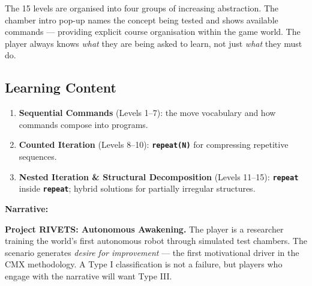 \documentclass[12pt,a4paper]{article}
\newcommand{\keyword}[1]{\textcolor{keyword}{\texttt{\bfseries #1}}}
\newcommand{\gddfield}[2]{%
  \noindent\begin{minipage}[t]{3.5cm}\bfseries\color{accent}\sffamily#1\end{minipage}%
  \hspace{8pt}%
  \begin{minipage}[t]{\dimexpr\linewidth-3.5cm-8pt\relax}%
    #2
  \end{minipage}\par\smallskip}
\begin{document}
\vspace{4pt}

\begin{tcolorbox}[gddbox, title={Course Organisation}]
The 15 levels are organised into four groups of increasing abstraction. The chamber intro pop-up names the concept being tested and shows available commands --- providing explicit course organisation within the game world. The player always knows \emph{what} they are being asked to learn, not just \emph{what} they must do.
\end{tcolorbox}

\vspace{6pt}

\subsection{Learning Content}

\begin{tcolorbox}[gddbox, title={Units of Learning}]
\begin{enumerate}[label=\textbf{Unit \arabic*.}, leftmargin=3.5em, noitemsep]
  \item \textbf{Sequential Commands} (Levels 1--7): the move vocabulary and how commands compose into programs.
  \item \textbf{Counted Iteration} (Levels 8--10): \keyword{repeat(N)} for compressing repetitive sequences.
  \item \textbf{Nested Iteration \& Structural Decomposition} (Levels 11--15): \keyword{repeat} inside \keyword{repeat}; hybrid solutions for partially irregular structures.
\end{enumerate}
\end{tcolorbox}

\vspace{4pt}

\begin{tcolorbox}[gddbox, title={Scenario}]
\gddfield{Narrative:}{\textbf{Project RIVETS: Autonomous Awakening.} The player is a researcher training the world's first autonomous robot through simulated test chambers. The scenario generates \emph{desire for improvement} --- the first motivational driver in the CMX methodology. A Type I classification is not a failure, but players who engage with the narrative will want Type III.}
\end{tcolorbox}

\vspace{4pt}
\end{document}
